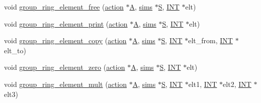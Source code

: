 \begin{DoxyCompactItemize}
\item 
void \mbox{\hyperlink{action__global_8_c_a365bffb4c4f5ded832a609c046b99b63}{group\+\_\+ring\+\_\+element\+\_\+free}} (\mbox{\hyperlink{classaction}{action}} $\ast$\mbox{\hyperlink{simeon_8_c_a97833f04c3a9c008df5521a2fc291bb4}{A}}, \mbox{\hyperlink{classsims}{sims}} $\ast$\mbox{\hyperlink{simeon_8_c_adab47f8243f1b5a2c31df2535d6b37d0}{S}}, \mbox{\hyperlink{galois_8h_a09fddde158a3a20bd2dcadb609de11dc}{I\+NT}} $\ast$elt)
\item 
void \mbox{\hyperlink{action__global_8_c_ade71b852e79498cf1119faf78034b7b2}{group\+\_\+ring\+\_\+element\+\_\+print}} (\mbox{\hyperlink{classaction}{action}} $\ast$\mbox{\hyperlink{simeon_8_c_a97833f04c3a9c008df5521a2fc291bb4}{A}}, \mbox{\hyperlink{classsims}{sims}} $\ast$\mbox{\hyperlink{simeon_8_c_adab47f8243f1b5a2c31df2535d6b37d0}{S}}, \mbox{\hyperlink{galois_8h_a09fddde158a3a20bd2dcadb609de11dc}{I\+NT}} $\ast$elt)
\item 
void \mbox{\hyperlink{action__global_8_c_a7afb8c47b30d0033c84e08329a72083c}{group\+\_\+ring\+\_\+element\+\_\+copy}} (\mbox{\hyperlink{classaction}{action}} $\ast$\mbox{\hyperlink{simeon_8_c_a97833f04c3a9c008df5521a2fc291bb4}{A}}, \mbox{\hyperlink{classsims}{sims}} $\ast$\mbox{\hyperlink{simeon_8_c_adab47f8243f1b5a2c31df2535d6b37d0}{S}}, \mbox{\hyperlink{galois_8h_a09fddde158a3a20bd2dcadb609de11dc}{I\+NT}} $\ast$elt\+\_\+from, \mbox{\hyperlink{galois_8h_a09fddde158a3a20bd2dcadb609de11dc}{I\+NT}} $\ast$elt\+\_\+to)
\item 
void \mbox{\hyperlink{action__global_8_c_a1927d1005f9747c543f4fbd7b3b4d2cf}{group\+\_\+ring\+\_\+element\+\_\+zero}} (\mbox{\hyperlink{classaction}{action}} $\ast$\mbox{\hyperlink{simeon_8_c_a97833f04c3a9c008df5521a2fc291bb4}{A}}, \mbox{\hyperlink{classsims}{sims}} $\ast$\mbox{\hyperlink{simeon_8_c_adab47f8243f1b5a2c31df2535d6b37d0}{S}}, \mbox{\hyperlink{galois_8h_a09fddde158a3a20bd2dcadb609de11dc}{I\+NT}} $\ast$elt)
\item 
void \mbox{\hyperlink{action__global_8_c_a0ac80b53427a7aa24a18f9f860819a6d}{group\+\_\+ring\+\_\+element\+\_\+mult}} (\mbox{\hyperlink{classaction}{action}} $\ast$\mbox{\hyperlink{simeon_8_c_a97833f04c3a9c008df5521a2fc291bb4}{A}}, \mbox{\hyperlink{classsims}{sims}} $\ast$\mbox{\hyperlink{simeon_8_c_adab47f8243f1b5a2c31df2535d6b37d0}{S}}, \mbox{\hyperlink{galois_8h_a09fddde158a3a20bd2dcadb609de11dc}{I\+NT}} $\ast$elt1, \mbox{\hyperlink{galois_8h_a09fddde158a3a20bd2dcadb609de11dc}{I\+NT}} $\ast$elt2, \mbox{\hyperlink{galois_8h_a09fddde158a3a20bd2dcadb609de11dc}{I\+NT}} $\ast$elt3)

\end{DoxyCompactItemize}

